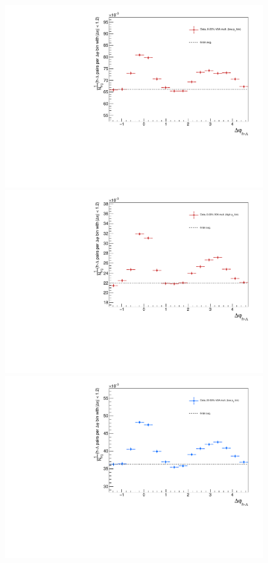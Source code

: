 \begin{figure}[ht]
	\centering
	\begin{minipage}{0.48\textwidth}
		\includegraphics[width=\textwidth]{figures/analysis/h_lambda_dphi_avg6_0_20_lowpt.pdf}
	\end{minipage}
	\begin{minipage}{0.48\textwidth}
		\includegraphics[width=\textwidth]{figures/analysis/h_lambda_dphi_avg6_0_20_highpt.pdf}
	\end{minipage}
	\begin{minipage}{0.48\textwidth}
		\includegraphics[width=\textwidth]{figures/analysis/h_lambda_dphi_avg6_20_50_lowpt.pdf}

\end{minipage}
\end{figure}
